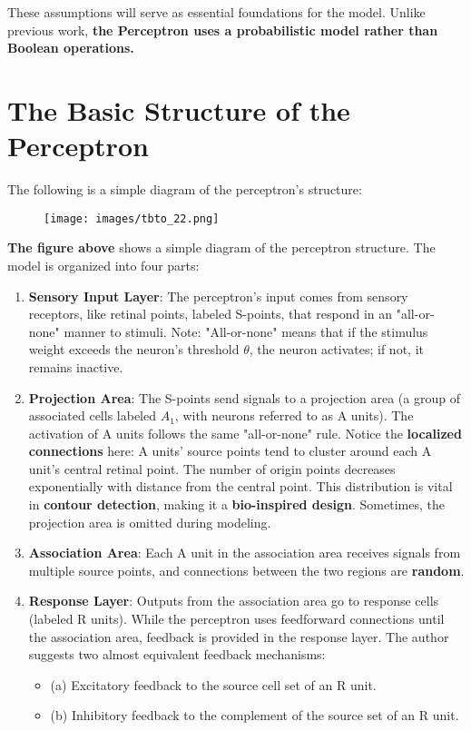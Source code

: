 \documentclass[11p,oneside]{book}
\begin{document}
These assumptions will serve as essential foundations for the model. Unlike previous work, \textbf{the Perceptron uses a probabilistic model rather than Boolean operations.}

\section*{The Basic Structure of the Perceptron}

The following is a simple diagram of the perceptron’s structure:

\begin{figure}[H]
    \centering
    \texttt{[image: images/tbto\_22.png]}
\end{figure}

\textbf{The figure above} shows a simple diagram of the perceptron structure. The model is organized into four parts:

\begin{enumerate}
    \item \textbf{Sensory Input Layer}: The perceptron’s input comes from sensory receptors, like retinal points, labeled S-points, that respond in an "all-or-none" manner to stimuli. Note: "All-or-none" means that if the stimulus weight exceeds the neuron’s threshold $\theta$, the neuron activates; if not, it remains inactive.
    \item \textbf{Projection Area}: The S-points send signals to a projection area (a group of associated cells labeled $A_1$, with neurons referred to as A units). The activation of A units follows the same "all-or-none" rule. Notice the \textbf{localized connections} here: A units’ source points tend to cluster around each A unit’s central retinal point. The number of origin points decreases exponentially with distance from the central point. This distribution is vital in \textbf{contour detection}, making it a \textbf{bio-inspired design}. Sometimes, the projection area is omitted during modeling.
    \item \textbf{Association Area}: Each A unit in the association area receives signals from multiple source points, and connections between the two regions are \textbf{random}.
    \item \textbf{Response Layer}: Outputs from the association area go to response cells (labeled R units). While the perceptron uses feedforward connections until the association area, feedback is provided in the response layer. The author suggests two almost equivalent feedback mechanisms:
    \begin{itemize}
        \item (a) Excitatory feedback to the source cell set of an R unit.
        \item (b) Inhibitory feedback to the complement of the source set of an R unit.
    \end{itemize}
\end{enumerate}
\end{document}
